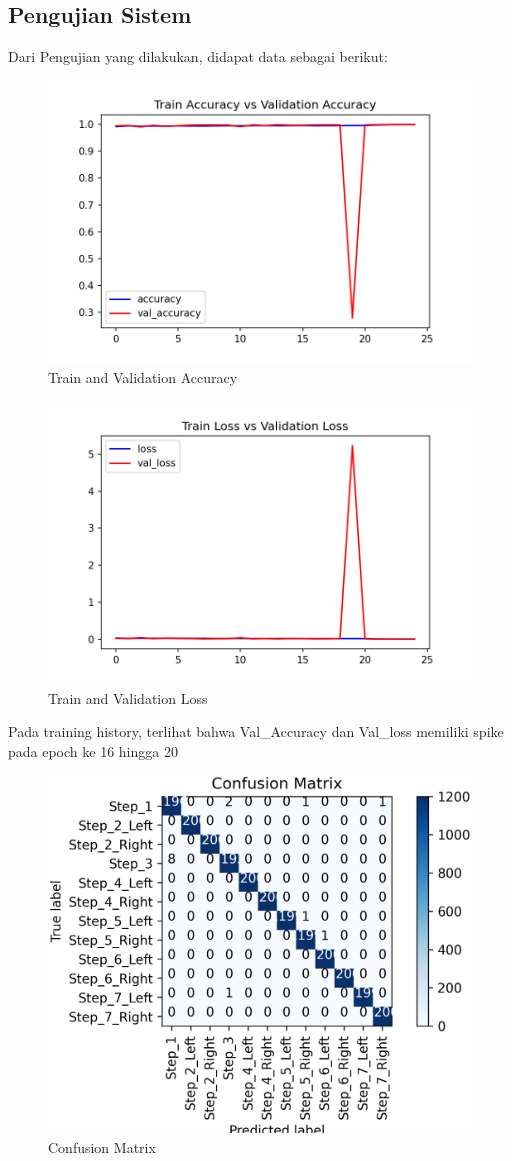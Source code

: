 \subsection{Pengujian Sistem}
\label{subsec:ujisistem}

Dari Pengujian yang dilakukan, didapat data sebagai berikut:
\begin{figure}[!ht]
	\centering
	\includegraphics[width=0.5\columnwidth]{gambar/train-val-acc.png}
	\caption{Train and Validation Accuracy}
	\label{fig:train-val-acc}
\end{figure}
\begin{figure}[!ht]
	\centering
	\includegraphics[width=0.5\columnwidth]{gambar/train-val-loss.png}
	\caption{Train and Validation Loss}
	\label{fig:train-val-loss}
\end{figure}

Pada training history, terlihat bahwa Val\_Accuracy dan Val\_loss memiliki spike pada epoch ke 16 hingga 20

\begin{figure}[!ht]
	\centering
	\includegraphics[width=0.6\columnwidth]{gambar/confusion-matrix.png}
	\caption{Confusion Matrix}
	\label{fig:confmatx}
\end{figure}


